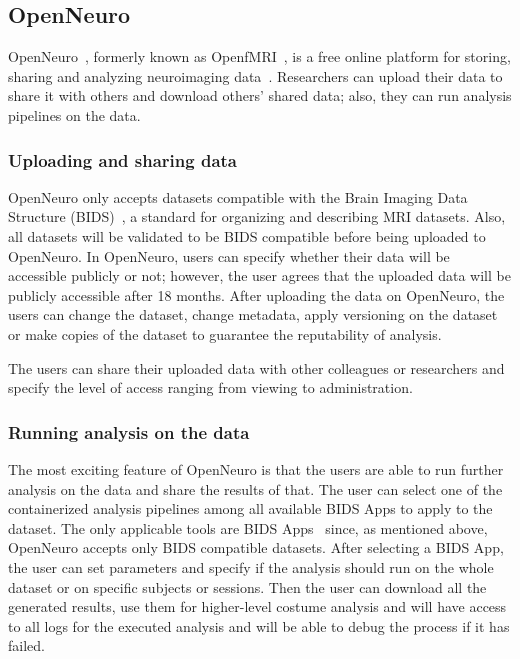 \subsection{OpenNeuro}
OpenNeuro~\cite{markiewicz2021openneuro,gorgolewski2017openneuro}, formerly known as OpenfMRI~\cite{poldrack2017openfmri}, is a free online platform for storing, sharing and analyzing neuroimaging data~\cite{gorgolewski2017openneuro}. Researchers can upload their data to share it with others and download others' shared data; also, they can run analysis pipelines on the data. 

\subsubsection{Uploading and sharing data}
 OpenNeuro only accepts datasets compatible with the Brain Imaging Data Structure (BIDS)~\cite{gorgolewski2016brain}, a standard for organizing and describing MRI datasets. Also, all datasets will be validated to be BIDS compatible before being uploaded to OpenNeuro.
 In OpenNeuro, users can specify whether their data will be accessible publicly or not; however, the user agrees that the uploaded data will be publicly accessible after 18 months. After uploading the data on OpenNeuro, the users can change the dataset, change metadata, apply versioning on the dataset or make copies of the dataset to guarantee the reputability of analysis. 
 
 The users can share their uploaded data with other colleagues or researchers and specify the level of access ranging from viewing to administration. 

\subsubsection{Running analysis on the data }
The most exciting feature of OpenNeuro is that the users are able to run further analysis on the data and share the results of that. The user can select one of the containerized analysis pipelines among all available BIDS Apps to apply to the dataset. The only applicable tools are BIDS Apps~\cite{gorgolewski2017bids} since, as mentioned above, OpenNeuro accepts only BIDS compatible datasets. After selecting a BIDS App, the user can set parameters and specify if the analysis should run on the whole dataset or on specific subjects or sessions. Then the user can download all the generated results, use them for higher-level costume analysis and will have access to all logs for the executed analysis and will be able to debug the process if it has failed.


